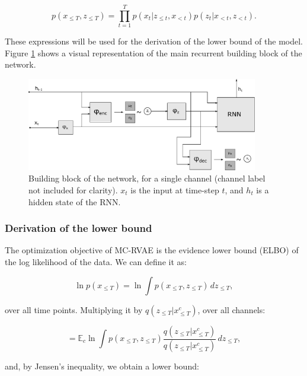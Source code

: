 \begin{equation} \label{eq:encfact}
    \mathit{p}(x_{\leq T}, z_{\leq T}) = \prod^T_{t=1} \mathit{p}(x_t | z_{\leq t}, x_{<t})\mathit{p}(z_t | x_{<t}, z_{<t}).
\end{equation}

These expressions will be used for the derivation of the lower bound of the model. Figure \ref{fig:rnn} shows a visual representation of the main recurrent building block of the network.

\begin{figure}[!htbp]
  \centering
    \includegraphics[width=0.9\textwidth]{figures/rnnvae/Fig1.pdf}
  \caption[Building block of the network, for a single channel.]{Building block of the network, for a single channel (channel label not included for clarity). $x_t$ is the input at time-step $t$, and $h_t$ is a hidden state of the RNN. }\label{fig:rnn}
\end{figure}

\subsubsection{Derivation of the lower bound}
The optimization objective of MC-RVAE is the evidence lower bound (ELBO) \cite{Kingma2014} of the log likelihood of the data. We can define it as:

\begin{equation}
    \ln \mathit{p}(x_{\leq T}) = \ln \int \mathit{p}(x_{\leq T}, z_{\leq T}) \,dz_{\leq T},
\end{equation}

over all time points. Multiplying it by $\mathit{q}(z_{\leq T}|x^c_{\leq T})$, over all channels:

\begin{equation}
= \mathbb{E}_c \ln \int \mathit{p}(x_{\leq T}, z_{\leq T}) \frac{\mathit{q}(z_{\leq T}|x^c_{\leq T})}{\mathit{q}(z_{\leq T}|x^c_{\leq T})} \,dz_{\leq T},
\end{equation}

and, by Jensen's inequality, we obtain a lower bound:

